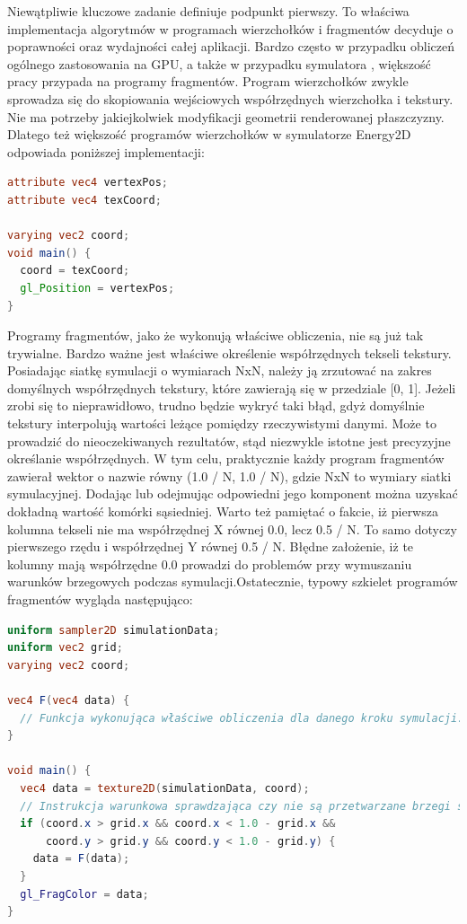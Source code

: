 Niewątpliwie kluczowe zadanie definiuje podpunkt pierwszy. To właściwa
implementacja algorytmów w programach wierzchołków i fragmentów decyduje o
poprawności oraz wydajności całej aplikacji. Bardzo często w przypadku obliczeń
ogólnego zastosowania na GPU, a także w przypadku symulatora ,
większość pracy przypada na programy fragmentów. Program wierzchołków zwykle
sprowadza się do skopiowania wejściowych współrzędnych wierzchołka i tekstury.
Nie ma potrzeby jakiejkolwiek modyfikacji geometrii renderowanej płaszczyzny.
Dlatego też większość programów wierzchołków w symulatorze Energy2D odpowiada
poniższej implementacji:

\begin{lstlisting}[language=GLSL, caption=Typowa implementacja programu
wierzchołków w symulatorze \ow{Energy2D} (język GLSL)]
attribute vec4 vertexPos;
attribute vec4 texCoord;

varying vec2 coord;
void main() {
  coord = texCoord;
  gl_Position = vertexPos;
}
\end{lstlisting}

Programy fragmentów, jako że wykonują właściwe obliczenia, nie są już tak
trywialne. Bardzo ważne jest właściwe określenie współrzędnych tekseli tekstury.
Posiadając siatkę symulacji o wymiarach NxN, należy ją zrzutować na zakres
domyślnych współrzędnych tekstury, które zawierają się w przedziale [0, 1].
Jeżeli zrobi się to nieprawidłowo, trudno będzie wykryć taki błąd, gdyż
domyślnie tekstury interpolują wartości leżące pomiędzy rzeczywistymi danymi.
Może to prowadzić do nieoczekiwanych rezultatów, stąd niezwykle istotne jest
precyzyjne określanie współrzędnych. W tym celu, praktycznie każdy program
fragmentów zawierał wektor o nazwie  równy (1.0 / N, 1.0 / N), gdzie
NxN to wymiary siatki symulacyjnej. Dodając lub odejmując odpowiedni jego
komponent można uzyskać dokładną wartość komórki sąsiedniej. Warto też pamiętać
o fakcie, iż pierwsza kolumna tekseli nie ma współrzędnej X równej 0.0, lecz 0.5
/ N. To samo dotyczy pierwszego rzędu i współrzędnej Y równej 0.5 / N. Błędne
założenie, iż te kolumny mają współrzędne 0.0 prowadzi do problemów przy
wymuszaniu warunków brzegowych podczas symulacji.Ostatecznie, typowy szkielet
programów fragmentów wygląda następująco:

\begin{lstlisting}[language=GLSL, caption=Szkielet implementacji programu
fragmentów w symulatorze \ow{Energy2D} (język GLSL)]
uniform sampler2D simulationData;
uniform vec2 grid;
varying vec2 coord;

vec4 F(vec4 data) {
  // Funkcja wykonująca właściwe obliczenia dla danego kroku symulacji.
}

void main() {
  vec4 data = texture2D(simulationData, coord);
  // Instrukcja warunkowa sprawdzająca czy nie są przetwarzane brzegi siatki.
  if (coord.x > grid.x && coord.x < 1.0 - grid.x &&
      coord.y > grid.y && coord.y < 1.0 - grid.y) {
    data = F(data);
  }
  gl_FragColor = data;
}
\end{lstlisting}

